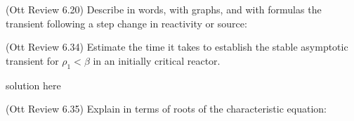 \documentclass[11pt,addpoints,answers]{exam}
\begin{document}
\begin{questions}
        \question (Ott Review 6.20) Describe in words, with graphs, and with 
        formulas the transient following a step change in reactivity or source:

        \question (Ott Review 6.34) Estimate the time it takes to establish the 
        stable asymptotic transient for $\rho_1 < \beta$ in an initially 
        critical reactor.
                \begin{solution}
                        solution here
                \end{solution}


        \question[10] (Ott Review 6.35) Explain in terms of roots of the 
        characteristic equation:
\end{questions}
\end{document}
